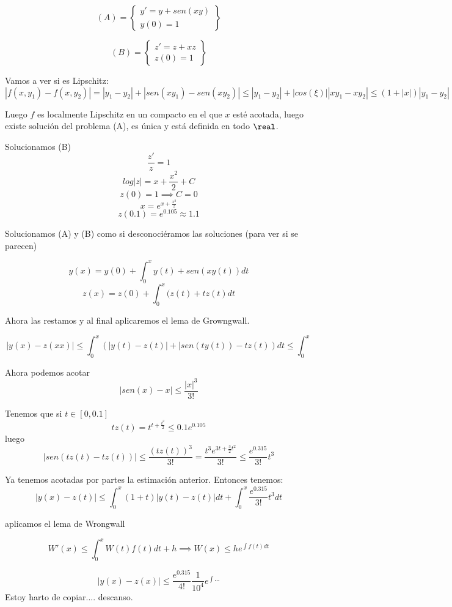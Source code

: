 \documentclass[nochap]{apuntes}
\begin{document}
\begin{problem}[15]
\[(A)=\left\{\begin{array}{c} y'=y+sen(xy)\\y(0)=1 \end{array}\right\}\]

\[(B)=\left\{\begin{array}{c} z'=z+xz\\z(0)=1 \end{array}\right\}\]

\solution

Vamos a ver si es Lipschitz:
$|f(x,y_1) - f(x,y_2)| = |y_1-y_2| + |sen(xy_1) -sen(xy_2)| \leq |y_1-y_2| + |cos(\xi)| |xy_1 - xy_2| \leq (1+|x|)|y_1-y_2|$

Luego $f$ es localmente Lipschitz en un compacto en el que $x$ esté acotada, luego existe solución del problema (A), es única y está definida en todo $\real$.


Solucionamos (B) \[\frac{z'}{z} = 1\]
\[log|z| = x+\frac{x^2}{2} + C\]
\[z(0)=1 \implies C=0\]
\[x = e^{x+\frac{x^2}{2}}\]
\[z(0.1) = e^{0.105} \approx 1.1\]

Solucionamos (A) y (B) como si desconociéramos las soluciones (para ver si se parecen)

\[y(x) = y(0) + \int_0^x y(t) + sen(xy(t))dt\]
\[z(x) = z(0) + \int_0^x (z(t) + tz(t)dt\]	

Ahora las restamos y al final aplicaremos el lema de Growngwall.

\[|y(x) - z(xx)| \leq \int_0^x \left(|y(t)-z(t)| + |sen(ty(t)) - tz(t)\right) dt \leq \int_0^x\]

Ahora podemos acotar \[|sen(x) - x| \leq \frac{|x|^3}{3!}\]

Tenemos que si $t\in[0,0.1]$
\[tz(t) = t^{t+\frac{t^2}{2}} \leq 0.1e^{0.105}\]
luego 
\[|sen(tz(t) - tz(t))| \leq \frac{(tz(t))^3}{3!} = \frac{t^3e^{3t+\frac{3}{2}t^2}}{3!} \leq \frac{e^{0.315}}{3!}t^3\]

Ya tenemos acotadas por partes la estimación anterior. Entonces tenemos:
\[|y(x) - z(t)| \leq \int_0^x (1+t)|y(t)-z(t)|dt + \int_0^x\frac{e^{0.315}}{3!}t^3dt\]

aplicamos el lema de Wrongwall

\[W'(x) \leq \int_0^x W(t) f(t) dt + h \implies W(x) \leq h e^{\int f(t)dt}\]

\[|y(x) - z(x)| \leq \frac{e^{0.315}}{4!} \frac{1}{10^4} e^{\int...}\]
Estoy harto de copiar.... descanso.

\end{problem}
\end{document}
